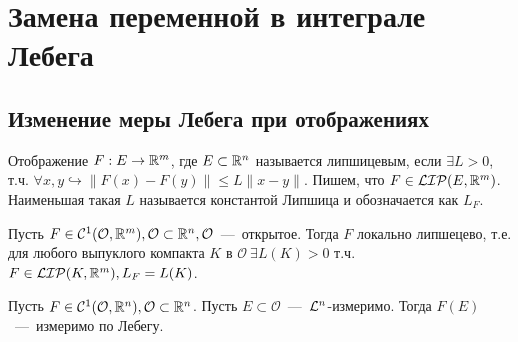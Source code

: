 \section{Замена переменной в интеграле Лебега}
\subsection{Изменение меры Лебега при отображениях}
\begin{reminder}
    Отображение $F: E \rightarrow \mathbb{R}^m$, где $E \subset \mathbb{R}^n$ называется липшицевым, если $\exists L > 0$, т.ч. $\forall x, y \hookrightarrow \|F(x) - F(y)\| \leq L\|x - y\|$. Пишем, что $F \in \mathcal{LIP}(E, \mathbb{R}^m)$. Наименьшая такая $L$ называется константой Липшица и обозначается как $L_F$.
\end{reminder}
\begin{fact}
    Пусть $F \in \mathcal{C}^1(\mathcal{O}, \mathbb{R}^m), \mathcal{O} \subset \mathbb{R}^n, \mathcal{O}$~---~открытое. Тогда $F$ локально липшецево, т.е. для любого выпуклого компакта $K$ в $\mathcal{O} \   \exists L(K) > 0$ т.ч. $F \in \mathcal{LIP}(K, \mathbb{R}^m), L_F = L(K)$.
\end{fact}
\begin{theorem}
    Пусть $F \in \mathcal{C}^1(\mathcal{O}, \mathbb{R}^n), \mathcal{O} \subset \mathbb{R}^n$. Пусть $E \subset \mathcal{O}$~---~$\mathcal{L}^n$-измеримо. Тогда $F(E)$~---~измеримо по Лебегу.
\end{theorem}
